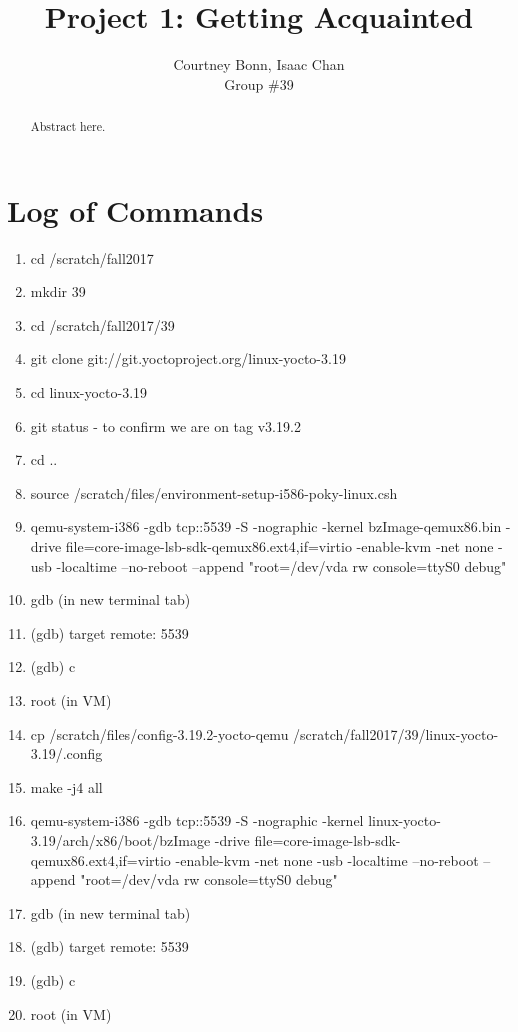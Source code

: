 \documentclass[letterpaper,10pt,draftclsnofoot,onecolumn,titlepage]{IEEEtran}
\def\name{Courtney Bonn, Isaac Chan}
\def\grp{Group \#39}
\begin{document}
\title{Project 1: Getting Acquainted}
\author{\name \\ \grp}

\maketitle

\begin{abstract}
Abstract here.
\end{abstract}

\clearpage



\section{Log of Commands}
\begin{enumerate}
\item cd /scratch/fall2017
\item mkdir 39
\item cd /scratch/fall2017/39
\item git clone git://git.yoctoproject.org/linux-yocto-3.19
\item cd linux-yocto-3.19
\item git status - to confirm we are on tag v3.19.2
\item cd ..
\item source /scratch/files/environment-setup-i586-poky-linux.csh
\item qemu-system-i386 -gdb tcp::5539 -S -nographic -kernel bzImage-qemux86.bin -drive file=core-image-lsb-sdk-qemux86.ext4,if=virtio -enable-kvm -net none -usb -localtime --no-reboot --append "root=/dev/vda rw console=ttyS0 debug"
\item gdb (in new terminal tab)
\item (gdb) target remote: 5539
\item (gdb) c
\item root (in VM)
\item cp /scratch/files/config-3.19.2-yocto-qemu /scratch/fall2017/39/linux-yocto-3.19/.config
\item make -j4 all
\item qemu-system-i386 -gdb tcp::5539 -S -nographic -kernel linux-yocto-3.19/arch/x86/boot/bzImage -drive file=core-image-lsb-sdk-qemux86.ext4,if=virtio -enable-kvm -net none -usb -localtime --no-reboot --append "root=/dev/vda rw console=ttyS0 debug"
\item gdb (in new terminal tab)
\item (gdb) target remote: 5539
\item (gdb) c
\item root (in VM)
\end{enumerate}
\end{document}
